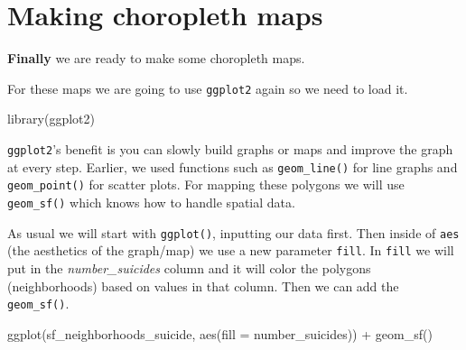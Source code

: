 \documentclass[
]{krantz}
\makeatletter
\newenvironment{Shaded}{\begin{snugshade}}{\end{snugshade}}
\newcommand{\AttributeTok}[1]{\textcolor[rgb]{0.61,0.61,0.61}{#1}}
\newcommand{\CommentTok}[1]{\textcolor[rgb]{0.37,0.37,0.37}{\textit{#1}}}
\newcommand{\FunctionTok}[1]{\textcolor[rgb]{0,0,0}{#1}}
\newcommand{\NormalTok}[1]{#1}
\newcommand{\SpecialCharTok}[1]{\textcolor[rgb]{0,0,0}{#1}}
\newenvironment{kframe}{%
\medskip{}
\setlength{\fboxsep}{.8em}
 \def\at@end@of@kframe{}%
 \ifinner\ifhmode%
  \def\at@end@of@kframe{\end{minipage}}%
  \begin{minipage}{\columnwidth}%
 \fi\fi%
 \def\FrameCommand##1{\hskip\@totalleftmargin \hskip-\fboxsep
 \colorbox{shadecolor}{##1}\hskip-\fboxsep
     \hskip-\linewidth \hskip-\@totalleftmargin \hskip\columnwidth}%
 \MakeFramed {\advance\hsize-\width
   \@totalleftmargin\z@ \linewidth\hsize
   \@setminipage}}%
 {\par\unskip\endMakeFramed%
 \at@end@of@kframe}
\renewenvironment{Shaded}{\begin{kframe}}{\end{kframe}}
\makeatother
\begin{document}
\begin{Shaded}
\end{Shaded}

\hypertarget{making-choropleth-maps}{%
\section{Making choropleth maps}\label{making-choropleth-maps}}

\textbf{Finally} we are ready to make some choropleth maps.

For these maps we are going to use \texttt{ggplot2} again so we need to load it.

\begin{Shaded}
\begin{Highlighting}[]
\FunctionTok{library}\NormalTok{(ggplot2)}
\end{Highlighting}
\end{Shaded}

\texttt{ggplot2}'s benefit is you can slowly build graphs or maps and improve the graph at every step. Earlier, we used functions such as \texttt{geom\_line()} for line graphs and \texttt{geom\_point()} for scatter plots. For mapping these polygons we will use \texttt{geom\_sf()} which knows how to handle spatial data.

As usual we will start with \texttt{ggplot()}, inputting our data first. Then inside of \texttt{aes} (the aesthetics of the graph/map) we use a new parameter \texttt{fill}. In \texttt{fill} we will put in the \emph{number\_suicides} column and it will color the polygons (neighborhoods) based on values in that column. Then we can add the \texttt{geom\_sf()}.

\begin{Shaded}
\begin{Highlighting}[]
\FunctionTok{ggplot}\NormalTok{(sf\_neighborhoods\_suicide, }\FunctionTok{aes}\NormalTok{(}\AttributeTok{fill =}\NormalTok{ number\_suicides)) }\SpecialCharTok{+}
  \FunctionTok{geom\_sf}\NormalTok{()}
\end{Highlighting}
\end{Shaded}
\end{document}
